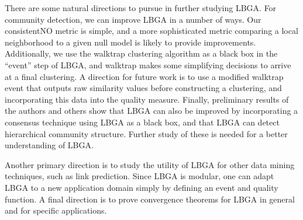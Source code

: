 \documentclass{article}
\begin{document}
There are some natural directions to pursue in further studying LBGA. For
community detection, we can improve LBGA in a number of ways. Our consistentNO
metric is simple, and a more sophisticated metric comparing a local
neighborhood to a given null model is likely to provide improvements.
Additionally, we use the walktrap clustering algorithm as a black box in the
``event'' step of LBGA, and walktrap makes some simplifying decisions to arrive
at a final clustering. A direction for future work is to use a modified
walktrap event that outputs raw similarity values before constructing a
clustering, and incorporating this data into the quality measure. Finally,
preliminary results of the authors and others show that LBGA can also be
improved by incorporating a consensus technique using LBGA as a black box, and
that LBGA can detect hierarchical community structure. Further study of these
is needed for a better understanding of LBGA.

Another primary direction is to study the utility of LBGA for other data mining
techniques, such as link prediction. Since LBGA is modular, one can adapt LBGA
to a new application domain simply by defining an event and quality function. A
final direction is to prove convergence theorems for LBGA in general and for
specific applications.


{\footnotesize


}
\end{document}
